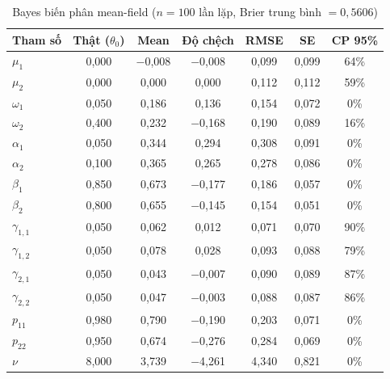 \documentclass[11pt,a4paper]{article}
\begin{document}
\begin{table}[H]\centering\scriptsize
\caption{Bayes biến phân mean-field ($n=100$ lần lặp, Brier trung bình $=0,5606$)}
\begin{tabularx}{\textwidth}{l C C C C C C}
\toprule
\textbf{Tham số} & \textbf{Thật ($\theta_0$)} & \textbf{Mean} & \textbf{Độ chệch} & \textbf{RMSE} & \textbf{SE} & \textbf{CP 95\%} \\
\midrule
$\mu_1$ & 0,000 & $-$0,008 & $-$0,008 & 0,099 & 0,099 & 64\% \\
$\mu_2$ & 0,000 & 0,000 & 0,000 & 0,112 & 0,112 & 59\% \\
$\omega_1$ & 0,050 & 0,186 & 0,136 & 0,154 & 0,072 & 0\% \\
$\omega_2$ & 0,400 & 0,232 & $-$0,168 & 0,190 & 0,089 & 16\% \\
$\alpha_1$ & 0,050 & 0,344 & 0,294 & 0,308 & 0,091 & 0\% \\
$\alpha_2$ & 0,100 & 0,365 & 0,265 & 0,278 & 0,086 & 0\% \\
$\beta_1$ & 0,850 & 0,673 & $-$0,177 & 0,186 & 0,057 & 0\% \\
$\beta_2$ & 0,800 & 0,655 & $-$0,145 & 0,154 & 0,051 & 0\% \\
$\gamma_{1,1}$ & 0,050 & 0,062 & 0,012 & 0,071 & 0,070 & 90\% \\
$\gamma_{1,2}$ & 0,050 & 0,078 & 0,028 & 0,093 & 0,088 & 79\% \\
$\gamma_{2,1}$ & 0,050 & 0,043 & $-$0,007 & 0,090 & 0,089 & 87\% \\
$\gamma_{2,2}$ & 0,050 & 0,047 & $-$0,003 & 0,088 & 0,087 & 86\% \\
$p_{11}$ & 0,980 & 0,790 & $-$0,190 & 0,203 & 0,071 & 0\% \\
$p_{22}$ & 0,950 & 0,674 & $-$0,276 & 0,284 & 0,069 & 0\% \\
$\nu$ & 8,000 & 3,739 & $-$4,261 & 4,340 & 0,821 & 0\% \\
\bottomrule
\end{tabularx}
\end{table}
\end{document}

